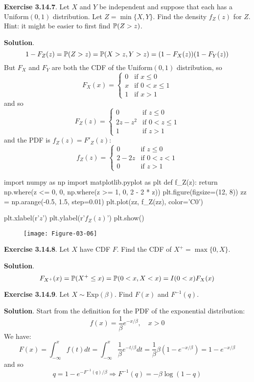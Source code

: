 \textbf{Exercise 3.14.7}. Let \(X\) and \(Y\) be independent and suppose
that each has a \(\text{Uniform}(0, 1)\) distribution. Let
\(Z = \min \{ X, Y \}\). Find the density \(f_Z(z)\) for \(Z\). Hint: it
might be easier to first find \(\operatorname{\mathbb{P}}(Z > z)\).

\textbf{Solution}.
\[
1 - F_Z(z) = \operatorname{\mathbb{P}}(Z > z) = \operatorname{\mathbb{P}}(X > z, Y > z) = (1 - F_X(z)) (1 - F_Y(z))
\]
But \(F_X\) and \(F_Y\) are both the CDF of the \(\text{Uniform}(0, 1)\)
distribution, so
\[
F_X(x) = \begin{cases}
0 &\text{if } x \leq 0 \\
x &\text{if } 0 < x \leq 1 \\
1 &\text{if } x > 1
\end{cases}
\]
and so
\[
F_Z(z) = \begin{cases}
0 &\text{if } z \leq 0 \\
2z - z^{2} &\text{if } 0 < z \leq 1 \\
1 &\text{if } z > 1
\end{cases}
\]
and the PDF is \(f_Z(z) = F'_Z(z)\):
\[
f_Z(z) = \begin{cases}
0 &\text{if } z \leq 0 \\
2 - 2z &\text{if } 0 < z < 1 \\
0 &\text{if } z > 1
\end{cases}
\]

\begin{python}
import numpy as np
import matplotlib.pyplot as plt
def f_Z(z):
    return np.where(z <= 0, 0, np.where(z >= 1, 0, 2 - 2 * z))
plt.figure(figsize=(12, 8))
zz = np.arange(-0.5, 1.5, step=0.01)
plt.plot(zz, f_Z(zz), color='C0')
    
plt.xlabel(r'$z$')
plt.ylabel(r'$f_Z(z)$')
plt.show()
\end{python}

\begin{figure}[H]
\centering
\texttt{[image: Figure-03-06]}
\end{figure}


\textbf{Exercise 3.14.8}. Let \(X\) have CDF \(F\). Find the CDF of
\(X^+ = \max \{0, X\}\).

\textbf{Solution}.
\[
F_{X^+}(x) = \operatorname{\mathbb{P}}(X^+ \leq x) = \operatorname{\mathbb{P}}(0 < x, X < x) = I(0 < x) F_X(x)
\]

\textbf{Exercise 3.14.9}. Let \(X \sim \text{Exp}(\beta)\). Find
\(F(x)\) and \(F^{-1}(q)\).

\textbf{Solution}. Start from the definition for the PDF of the
exponential distribution:
\[
f(x) = \frac{1}{\beta} e^{-x / \beta}, \quad x > 0
\]
We have:
\[
F(x) = \int_{-\infty}^x f(t) dt = \int_{-\infty}^x \frac{1}{\beta} e^{-t / \beta} dt = \frac{1}{\beta} \beta \left( 1 - e^{-x / \beta} \right) = 1 - e^{-x / \beta}
\]
and so
\[
q = 1 - e^{-F^{-1}(q) / \beta} \Longrightarrow F^{-1}(q) = -\beta \log (1 - q)
\]

